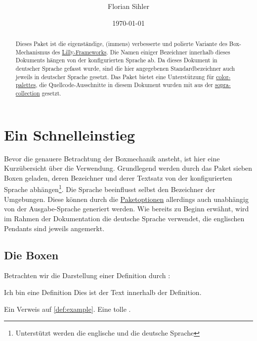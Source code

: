 \documentclass[ngerman]{article}
\title{\textsf{\paletteD{\{}\paletteA{lithie-boxes}\paletteD{\}}}}
\author{Florian Sihler}
\date{\today}
\def\env#1{\texttt{\paletteB{#1}}}
\def\envref#1{\hyperref[env:#1]{\env{#1}}}
\begin{document}
\maketitle

\begin{abstract}
    Dieses Paket ist die eigenständige, (immens) verbesserte und polierte Variante des Box-Mechanismus des \href{https://github.com/EagleoutIce/LILLY}{Lilly-Frameworks}. Die Namen einiger Bezeichner innerhalb dieses Dokuments hängen von der konfigurierten Sprache ab. Da dieses Dokument in deutscher Sprache gefasst wurde, sind die hier angegebenen Standardbezeichner auch jeweils in deutscher Sprache gesetzt. Das Paket bietet eine Unterstützung für \href{https://github.com/EagleoutIce/color-palettes}{color-palettes}, die Quellcode-Ausschnitte in diesem Dokument wurden mit  aus der \href{https://github.com/EagleoutIce/sopra-collection}{sopra-collection} gesetzt.
\end{abstract}

\tableofcontents

\section{Ein Schnelleinstieg}

Bevor die genauere Betrachtung der Boxmechanik ansteht, ist hier eine Kurzübersicht über die Verwendung. Grundlegend werden durch das Paket sieben Boxen geladen, deren Bezeichner und derer Textsatz von der konfigurierten Sprache abhängen\footnote{Unterstützt werden die englische und die deutsche Sprache}.
Die Sprache beeinflusst selbst den Bezeichner der Umgebungen. Diese können durch die \hyperref[sec:packetoptions]{Paketoptionen} allerdings auch unabhängig von der Ausgabe-Sprache generiert werden.
Wie bereits zu Beginn erwähnt, wird im Rahmen der Dokumentation die deutsche Sprache verwendet, die englischen Pendants
sind jeweils angemerkt.

\subsection{Die Boxen}

Betrachten wir die Darstellung einer Definition durch \envref{definition}:

\begin{latex}
\begin{definition}[Referenztitel]{Ich bin eine Definition}
    \label{def:example}Dies ist der Text innerhalb der Definition.
\end{definition}

Ein Verweis auf \autoref{def:example}. Eine tolle .
\end{latex}
\end{document}
